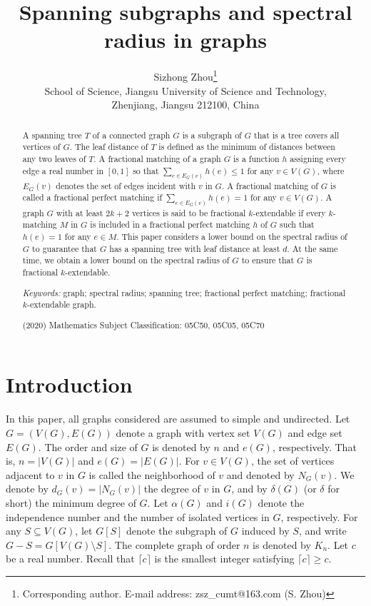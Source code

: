 \documentclass[10pt]{article}
\date{}
\numberwithin{equation}{section}
\begin{document}
\title{Spanning subgraphs and spectral radius in graphs
}
\author{\small  Sizhong Zhou\footnote{Corresponding
author. E-mail address: zsz\_cumt@163.com (S. Zhou)}\\
\small School of Science, Jiangsu University of Science and Technology,\\
\small Zhenjiang, Jiangsu 212100, China\\
}


\maketitle
\begin{abstract}
\noindent A spanning tree $T$ of a connected graph $G$ is a subgraph of $G$ that is a tree covers all vertices of $G$. The leaf distance of $T$ is
defined as the minimum of distances between any two leaves of $T$. A fractional matching of a graph $G$ is a function $h$ assigning every edge a
real number in $[0,1]$ so that $\sum\limits_{e\in E_G(v)}{h(e)}\leq1$ for any $v\in V(G)$, where $E_G(v)$ denotes the set of edges incident with $v$
in $G$. A fractional matching of $G$ is called a fractional perfect matching if $\sum\limits_{e\in E_G(v)}{h(e)}=1$ for any $v\in V(G)$. A graph $G$
with at least $2k+2$ vertices is said to be fractional $k$-extendable if every $k$-matching $M$ in $G$ is included in a fractional perfect matching
$h$ of $G$ such that $h(e)=1$ for any $e\in M$. This paper considers a lower bound on the spectral radius of $G$ to guarantee that $G$ has a spanning
tree with leaf distance at least $d$. At the same time, we obtain a lower bound on the spectral radius of $G$ to ensure that $G$ is fractional
$k$-extendable.
\\
\begin{flushleft}
{\em Keywords:} graph; spectral radius; spanning tree; fractional perfect matching; fractional $k$-extendable graph.

(2020) Mathematics Subject Classification: 05C50, 05C05, 05C70
\end{flushleft}
\end{abstract}

\section{Introduction}

In this paper, all graphs considered are assumed to simple and undirected. Let $G=(V(G),E(G))$ denote a graph with vertex set $V(G)$ and edge
set $E(G)$. The order and size of $G$ is denoted by $n$ and $e(G)$, respectively. That is, $n=|V(G)|$ and $e(G)=|E(G)|$. For $v\in V(G)$, the
set of vertices adjacent to $v$ in $G$ is called the neighborhood of $v$ and denoted by $N_G(v)$. We denote by $d_G(v)=|N_G(v)|$ the degree of
$v$ in $G$, and by $\delta(G)$ (or $\delta$ for short) the minimum degree of $G$. Let $\alpha(G)$ and $i(G)$ denote the independence number and
the number of isolated vertices in $G$, respectively. For any $S\subseteq V(G)$, let $G[S]$ denote the subgraph of $G$ induced by $S$, and write
$G-S=G[V(G)\setminus S]$. The complete graph of order $n$ is denoted by $K_n$. Let $c$ be a real number. Recall that $\lceil c\rceil$ is the
smallest integer satisfying $\lceil c\rceil\geq c$.
\end{document}
